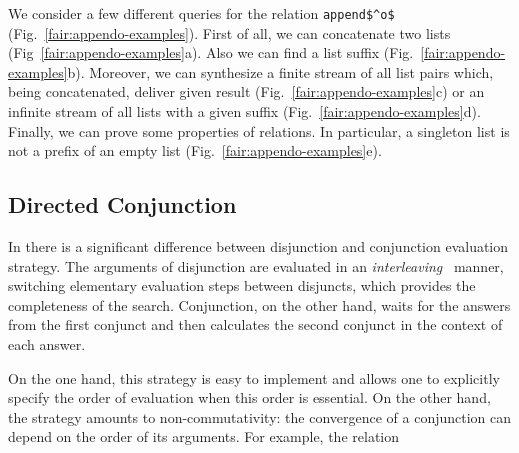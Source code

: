 We consider a few different queries for the relation \lstinline|append$^o$| (Fig.~\ref{fair:appendo-examples}). First of all, we can concatenate two lists
(Fig~\ref{fair:appendo-examples}a). Also we can find a list suffix (Fig.~\ref{fair:appendo-examples}b). Moreover, we can synthesize a finite stream of all
list pairs which, being concatenated, deliver given result (Fig.~\ref{fair:appendo-examples}c) or an infinite stream of all lists with a given suffix (Fig.~\ref{fair:appendo-examples}d).
Finally, we can prove some properties of relations. In particular, a singleton list is not a prefix of an empty list (Fig.~\ref{fair:appendo-examples}e).

\subsection{Directed Conjunction}


In \mk there is a significant difference between disjunction and conjunction evaluation strategy. The arguments of disjunction are evaluated
in an \emph{interleaving}~\cite{fair:interleaving} manner, switching elementary evaluation steps between disjuncts, which provides the completeness of the search.
Conjunction, on the other hand, waits for the answers from the first conjunct and then calculates the second conjunct in the context of each answer.

On the one hand, this strategy is easy to implement and allows one to explicitly specify the order of evaluation when this order is essential.
On the other hand, the strategy amounts to non-commutativity: the convergence of a conjunction can depend on the order of its arguments.
For example, the relation

